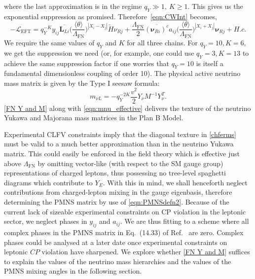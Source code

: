 \documentclass[11pt,letterpaper]{article}
\newcommand{\model}{Plan B Model}
\begin{document}
where the last approximation is in the regime $q_Y\gg 1,\ K \geq 1$. This gives us the exponential suppression as promised. Therefore~\cref{eqn:CWInt} becomes,
\begin{equation} \label{eqn:eft Yukawa and Majorana}
    -\mathcal{L}_{\text{EFT}} = q_Y^{-K}  y_{ij} \overline{\bm{L}_{L i}} \bigg(\frac{\langle \theta\rangle}{\Lambda_{\text{FN}}} \bigg)^{|X_i-X_j|} \tilde{H} \nu_{R j} +\frac{\Lambda_{\text{FN}}}{2}  \overline{(\bm{\nu}_{Ri})^c} a_{ij}  \Big( \frac{\langle\theta\rangle}{\Lambda_{\text{FN}}}\Big)^{|X_i + X_j|} \bm{\nu}_{Rj} +H.c.
\end{equation}
We require the same values of $q_Y$ and $K$ for all three chains. 
For $q_Y = 10, K=6$, we get the suppression we need (or, for example, one
could use $q_Y=3, K=13$ to achieve the same suppression factor if one worries
that $q_Y=10$ is itself a fundamental dimensionless coupling of order 10). The physical
active neutrino mass matrix is given by the Type I seesaw formula: 
\begin{equation} \label{eqn:mnu_effective}
    m_{\nu L} = -q_Y^{-2K}\frac{v^2}{2} Y_\nu M^{-1} Y_\nu^T.
\end{equation} 
\cref{FN Y and M} along with \cref{eqn:mnu_effective} delivers the texture of the neutrino Yukawa and Majorana
mass matrices in the \model.

Experimental CLFV constraints imply that the diagonal texture in
\cref{chferms} must be valid to a much better approximation than in the
neutrino Yukawa matrix. This could easily be enforced in the field theory
which is effective just above $\Lambda_\text{FN}$ by omitting vector-like (with
respect to the SM gauge group) representations of charged leptons, thus
possessing no tree-level spaghetti diagrams which contribute to $Y_E$. With
this in mind, we shall henceforth neglect contributions from charged-lepton
mixing in the gauge eigenbasis, therefore determining the PMNS matrix by use
of  \cref{eqn:PMNSdefn2}.
Because of the current lack of sizeable experimental constraints on CP violation in the leptonic sector, we neglect phases in $y_{ij}$ and $a_{ij}$. We are thus fitting to a scheme where all complex phases in the PMNS matrix in Eq.~(14.33) of Ref.~\cite{PDG} are zero.
Complex phases could be analysed at a later date once experimental
constraints on leptonic $CP$ violation have sharpened.
We explore whether \cref{FN Y and M} suffices to explain the values of the neutrino mass hierarchies and the values of the PMNS mixing angles in the following section.
\end{document}
